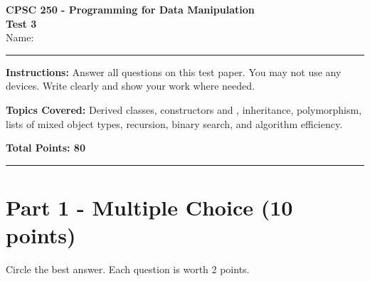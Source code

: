 \documentclass[11pt]{article}
\newcommand{\code}[1]{\texttt{\detokenize{#1}}}
\begin{document}
\begin{center}
{\Large \textbf{CPSC 250 - Programming for Data Manipulation}}\\
\vspace{0.15cm}
{\Large \textbf{Test 3}}\\
\vspace{0.35cm}
Name:\rule{3in}{0.4pt}
\end{center}

\textbf{Instructions:} Answer all questions on this test paper. You may not use any devices. Write clearly and show your work where needed.

\textbf{Topics Covered:} Derived classes, constructors and \code{super()}, inheritance, polymorphism, lists of mixed object types, recursion, binary search, and algorithm efficiency.

\textbf{Total Points: 80}

\hrule

\section*{Part 1 - Multiple Choice (10 points)}

Circle the best answer. Each question is worth 2 points.
\end{document}
